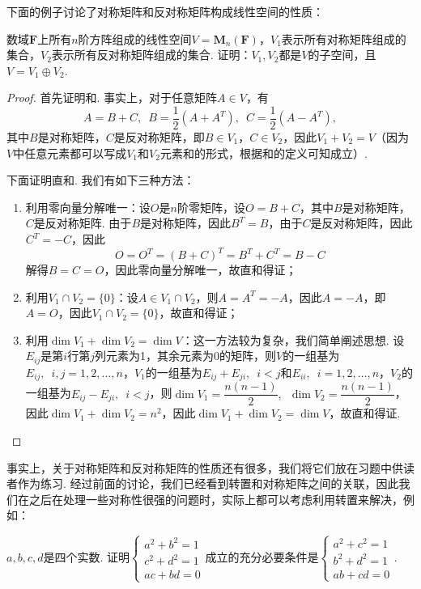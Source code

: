 下面的例子讨论了对称矩阵和反对称矩阵构成线性空间的性质：
\begin{example}{}{}
    数域$\mathbf{F}$上所有$n$阶方阵组成的线性空间$V=\mathbf{M}_n(\mathbf{F})$，$V_1$表示所有对称矩阵组成的集合，$V_2$表示所有反对称矩阵组成的集合. 证明：$V_1,V_2$都是$V$的子空间，且$V=V_1\oplus V_2$.
\end{example}

\begin{proof}
    首先证明和. 事实上，对于任意矩阵$A\in V$，有
    \[A=B+C,\enspace B=\frac{1}{2}(A+A^T),\enspace C=\frac{1}{2}(A-A^T),\]
    其中$B$是对称矩阵，$C$是反对称矩阵，即$B\in V_1$，$C\in V_2$，因此$V_1+V_2=V$（因为$V$中任意元素都可以写成$V_1$和$V_2$元素和的形式，根据和的定义可知成立）.

    下面证明直和. 我们有如下三种方法：
    \begin{enumerate}
        \item 利用零向量分解唯一：设$O$是$n$阶零矩阵，设$O=B+C$，其中$B$是对称矩阵，$C$是反对称矩阵. 由于$B$是对称矩阵，因此$B^T=B$，由于$C$是反对称矩阵，因此$C^T=-C$，因此
              \[O=O^T=(B+C)^T=B^T+C^T=B-C\]
              解得$B=C=O$，因此零向量分解唯一，故直和得证；

        \item 利用$V_1\cap V_2=\{0\}$：设$A\in V_1\cap V_2$，则$A=A^T=-A$，因此$A=-A$，即$A=O$，因此$V_1\cap V_2=\{0\}$，故直和得证；

        \item 利用$\dim V_1+\dim V_2=\dim V$：这一方法较为复杂，我们简单阐述思想. 设$E_{ij}$是第$i$行第$j$列元素为1，其余元素为0的矩阵，则$V$的一组基为$E_{ij},\enspace i,j=1,2,\ldots,n$，$V_1$的一组基为$E_{ij}+E_{ji},\enspace i<j$和$E_{ii},\enspace i=1,2,\ldots,n$，$V_2$的一组基为$E_{ij}-E_{ji},\enspace i<j$，则$\dim V_1=\dfrac{n(n-1)}{2},\enspace \dim V_2=\dfrac{n(n-1)}{2}$，因此$\dim V_1+\dim V_2=n^2$，因此$\dim V_1+\dim V_2=\dim V$，故直和得证.
    \end{enumerate}
\end{proof}

事实上，关于对称矩阵和反对称矩阵的性质还有很多，我们将它们放在习题中供读者作为练习. 经过前面的讨论，我们已经看到转置和对称矩阵之间的关联，因此我们在之后在处理一些对称性很强的问题时，实际上都可以考虑利用转置来解决，例如：
\begin{example}{}{}
    $a,b,c,d$是四个实数. 证明$\begin{cases}
            a^2+b^2=1 \\
            c^2+d^2=1 \\
            ac+bd=0
        \end{cases}$成立的充分必要条件是$\begin{cases}
            a^2+c^2=1 \\
            b^2+d^2=1 \\
            ab+cd=0
        \end{cases}$.
\end{example}

